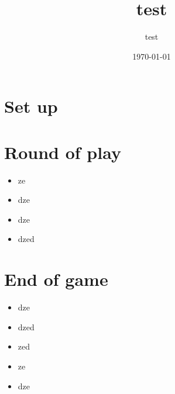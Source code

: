 \documentclass{article}%
\title{test}%
\author{test}%
\date{\today}%
\begin{document}
%
\pagestyle{empty}%
\normalsize%
\maketitle%
\section{ Set up
}%
\label{sec:Setup}%

%
\section{ Round of play
}%
\label{sec:Roundofplay}%
\begin{itemize}%
\item%
%
 ze
%
\item%
%
 dze
%
\item%
%
 dze
%
\item%
%
 dzed
%
\end{itemize}

%
\section{ End of game
}%
\label{sec:Endofgame}%
\begin{itemize}%
\item%
%
 dze
%
\item%
%
 dzed
%
\item%
%
 zed
%
\item%
%
 ze
%
\item%
%
 dze%
\end{itemize}

%
\end{document}
